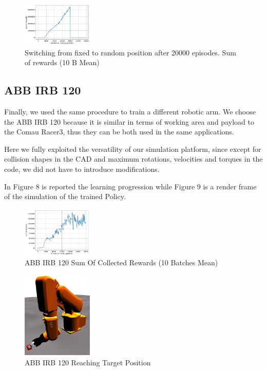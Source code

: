\documentclass{sig-alternate-05-2015}
\begin{document}
\begin{figure}[ht] \label{R3ConstToRand}
\centering
\includegraphics[width=0.3\textwidth]{Plots/R3_C_to_Rand_Rew.pdf}
\caption{Switching from fixed to random position after 20000 episodes. Sum of rewards
(10 B Mean)}
\end{figure}



\subsection{ABB IRB 120}
Finally, we used the same procedure to train a different robotic arm. We choose the ABB IRB 120 because it is similar in terms of working area and payload to the Comau Racer3, thus they can be both used in the same applications. 

Here we fully exploited the versatility of our simulation platform, since except for collision shapes in the CAD and maximum rotations, velocities and torques in the code, we did not have to introduce modifications.

In Figure 8 is reported the learning progression while Figure 9 is a render frame of the simulation of the trained Policy.

\begin{figure}[ht] \label{ABB_Rew}
\centering
\includegraphics[width=0.3\textwidth]{Plots/ABB_Rew.pdf}
\caption{ABB IRB 120 Sum Of Collected \newline Rewards (10 Batches Mean)}
\end{figure}

\begin{figure}[ht] \label{ABB}
\centering
\includegraphics[width=0.3\textwidth]{Figures/ABB.jpg}
\caption{ABB IRB 120 Reaching Target Position}
\end{figure}
\end{document}
